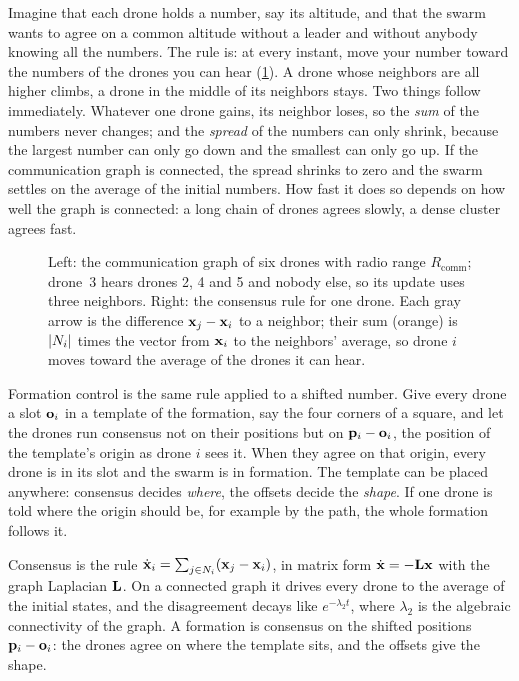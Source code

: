 Imagine that each drone holds a number, say its altitude, and that the swarm
wants to agree on a common altitude without a leader and without anybody
knowing all the numbers. The rule is: at every instant, move your number
toward the numbers of the drones you can hear (\cref{fig:ch23-idea}). A drone
whose neighbors are all higher climbs, a drone in the middle of its
neighbors stays. Two things follow immediately. Whatever one drone gains, its
neighbor loses, so the \emph{sum} of the numbers never changes; and the
\emph{spread} of the numbers can only shrink, because the largest number can
only go down and the smallest can only go up. If the communication graph is
connected, the spread shrinks to zero and the swarm settles on the average of
the initial numbers. How fast it does so depends on how well the graph is
connected: a long chain of drones agrees slowly, a dense cluster agrees fast.

\begin{figure}[tb]
  \centering
  \caption{Left: the communication graph of six drones with radio range
  $R_{\mathrm{comm}}$; drone~3 hears drones 2, 4 and 5 and nobody else, so its
  update uses three neighbors. Right: the consensus rule for one drone. Each
  gray arrow is the difference $\mathbf{x}_j - \mathbf{x}_i$ to a neighbor; their
  sum (orange) is $\left\lvert N_i \right\rvert$ times the vector from $\mathbf{x}_i$ to the
  neighbors' average, so drone $i$ moves toward the average of the drones it
  can hear.}
  \label{fig:ch23-idea}
\end{figure}

Formation control is the same rule applied to a shifted number. Give every
drone a slot $\mathbf{o}_i$ in a template of the formation, say the four corners
of a square, and let the drones run consensus not on their positions but on
$\mathbf{p}_i - \mathbf{o}_i$, the position of the template's origin as drone $i$ sees
it. When they agree on that origin, every drone is in its slot and the swarm
is in formation. The template can be placed anywhere: consensus decides
\emph{where}, the offsets decide the \emph{shape}. If one drone is told where
the origin should be, for example by the \cbs path, the whole formation
follows it.

\begin{keyidea}
Consensus is the rule $\dot{\mathbf{x}}_i = \sum_{j \in N_i} (\mathbf{x}_j -
\mathbf{x}_i)$, in matrix form $\dot{\mathbf{x}} = -\mathbf{L}\mathbf{x}$ with the
graph Laplacian $\mathbf{L}$. On a connected graph it drives every drone to the
average of the initial states, and the disagreement decays like
$e^{-\lambda_2 t}$, where $\lambda_2$ is the algebraic connectivity of the
graph. A formation is consensus on the shifted positions $\mathbf{p}_i - \mathbf{o}_i$:
the drones agree on where the template sits, and the offsets give the shape.
\end{keyidea}

